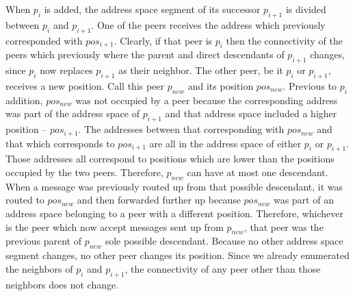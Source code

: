 \documentclass[12pt,english,journal]{elsarticle}
\makeatletter
\numberwithin{equation}{section}
\numberwithin{figure}{section}
\theoremstyle{plain}
\theoremstyle{plain}
\newenvironment{proof}[1][\protect\proofname]{\par
\normalfont\topsep6\p@\@plus6\p@\relax
\trivlist
\itemindent\parindent
\item[\hskip\labelsep
\scshape
#1]\ignorespaces
}{\endtrivlist\@endpefalse
}
\providecommand{\proofname}{Proof}
\makeatother
\begin{document}
\begin{proof}
When $p_{i}$ is added, the address space segment of its successor
$p_{i+1}$ is divided between $p_{i}$ and $p_{i+1}$. One of the
peers receives the address which previously corresponded with $pos_{i+1}$.
Clearly, if that peer is $p_{i}$ then the connectivity of the peers
which previously where the parent and direct descendants of $p_{i+1}$
changes, since $p_{i}$ now replaces $p_{i+1}$ as their neighbor.
The other peer, be it $p_{i}$ or $p_{i+1}$, receives a new position.
Call this peer $p_{new}$ and its position $pos_{new}$. Previous
to $p_{i}$ addition, $pos_{new}$ was not occupied by a peer because
the corresponding address was part of the address space of $p_{i+1}$
and that address space included a higher position -- $pos_{i+1}$.
The addresses between that corresponding with $pos_{new}$ and that
which corresponds to $pos_{i+1}$ are all in the address space of
either $p_{i}$ or $p_{i+1}$. Those addresses all correspond to positions
which are lower than the positions occupied by the two peers. Therefore,
$p_{new}$ can have at most one descendant. When a message was previously
routed up from that possible descendant, it was routed to $pos_{new}$
and then forwarded further up because $pos_{new}$ was part of an
address space belonging to a peer with a different position. Therefore,
whichever is the peer which now accept messages sent up from $p_{new}$,
that peer was the previous parent of $p_{new}$ sole possible descendant.
Because no other address space segment changes, no other peer changes
its position. Since we already enumerated the neighbors of $p_{i}$
and $p_{i+1}$, the connectivity of any peer other than those neighbors
does not change.\end{proof}
\end{document}
